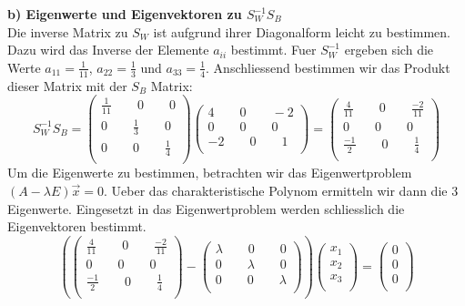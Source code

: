 \textbf{b) Eigenwerte und Eigenvektoren zu $S_W^{-1}S_B$} \\
Die inverse Matrix zu $S_W$ ist aufgrund ihrer Diagonalform leicht zu bestimmen. 
Dazu wird das Inverse der Elemente $a_{ii}$ bestimmt. Fuer $S_W^{-1}$ ergeben sich die Werte
$a_{11} = \frac{1}{11}$, $a_{22} = \frac{1}{3}$ und $a_{33} = \frac{1}{4}$.
Anschliessend bestimmen wir das Produkt dieser Matrix mit der $S_B$ Matrix:
\[
S_W^{-1}S_B =
\left(
\begin {array} {c}
\frac{1}{11} \qquad 0 \qquad 0  \\
0 \qquad \frac{1}{3} \qquad 0  \\
0 \qquad 0 \qquad \frac{1}{4}  \\
\end {array}
\right)
\left(
\begin {array} {c}
4 \qquad 0 \qquad -2  \\
0 \qquad 0 \qquad 0  \\
-2 \qquad 0 \qquad 1  \\
\end {array}
\right)
=
\left(
\begin {array} {c}
\frac{4}{11} \qquad 0 \qquad \frac{-2}{11}  \\
0 \qquad 0 \qquad 0  \\
\frac{-1}{2} \qquad 0 \qquad \frac{1}{4}  \\
\end {array}
\right)
\]
Um die Eigenwerte zu bestimmen, betrachten wir das Eigenwertproblem $(A - \lambda E) \vec{x} = 0$.
Ueber das charakteristische Polynom ermitteln wir dann die 3 Eigenwerte. Eingesetzt in
das Eigenwertproblem werden schliesslich die Eigenvektoren bestimmt.
\[
\left(
\left(
\begin {array} {c}
\frac{4}{11} \qquad 0 \qquad \frac{-2}{11}  \\
0 \qquad 0 \qquad 0  \\
\frac{-1}{2} \qquad 0 \qquad \frac{1}{4}  \\
\end {array}
\right)
-
\left(
\begin {array} {c}
\lambda \qquad 0 \qquad 0  \\
0 \qquad \lambda \qquad 0  \\
0 \qquad 0 \qquad \lambda  \\
\end {array}
\right)
\right)
\left(
\begin {array} {c}
x_1  \\
x_2  \\
x_3  \\
\end {array}
\right)
=
\left(
\begin {array} {c}
0  \\
0  \\
0  \\
\end {array}
\right)
\]
